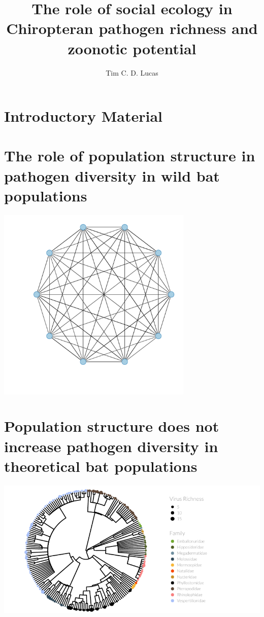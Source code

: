 \documentclass[11pt,phd,a4paper,twoside]{PrettyStanley}
\title{The role of social ecology in Chiropteran pathogen richness and zoonotic potential}
\author{Tim C. D. Lucas}
\begin{document}
\color{prettytext}







\chapter{Introductory Material}
\label{chapterlabel1}




\chapter{The role of population structure in pathogen diversity in wild bat populations}
\label{chapterlabel2}
\begin{center}
\includegraphics[width=0.7\textwidth]{imgs/fullyConnected.pdf}
\end{center}



\chapter{Population structure does not increase pathogen diversity in theoretical bat populations}
\label{chapterlabel3}
\begin{center}
\includegraphics[width=\textwidth]{figure/treePlot-1.pdf}
\end{center}

\end{document}

